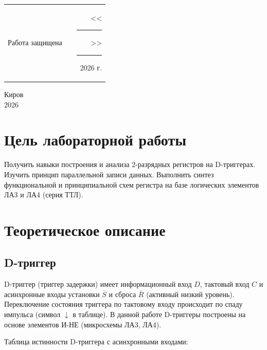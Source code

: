 \documentclass[oneside,a4paper,14pt]{extarticle}
\begin{document}
\noindent
\begin{tabular}{lp{58mm}r}
  Работа защищена &  & \hspace{5mm}<<\rule[-1mm]{5mm}{0.10mm}\/>>\rule[-1mm]{30mm}{0.10mm}\ 2026 г.
\end{tabular}
\vfill

\begin{center}
  Киров\\
  2026
\end{center}

\newpage\thispagestyle{plain}

\section{Цель лабораторной работы}
Получить навыки построения и анализа 2-разрядных регистров на D-триггерах. Изучить принцип параллельной записи данных. Выполнить синтез функциональной и принципиальной схем регистра на базе логических элементов ЛА3 и ЛА4 (серия ТТЛ).

\section{Теоретическое описание}
\subsection{D-триггер}
D-триггер (триггер задержки) имеет информационный вход $D$, тактовый вход $C$ и асинхронные входы установки $\overline{S}$ и сброса $\overline{R}$ (активный низкий уровень). Переключение состояния триггера по тактовому входу происходит по спаду импульса (символ $↓$ в таблице). В данной работе D-триггеры построены на основе элементов И-НЕ (микросхемы ЛА3, ЛА4).

Таблица истинности D-триггера с асинхронными входами:
\end{document}
